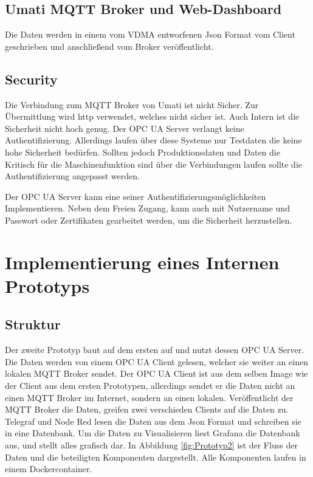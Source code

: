 \documentclass[a4paper, 12pt, oneside, toc=listofnumbered, bibliography=totoc]{scrbook}
\begin{document}
		
		
		\subsection{Umati MQTT Broker und Web-Dashboard}
	
		Die Daten werden in einem vom VDMA entworfenen Json Format vom Client geschrieben und anschließend vom Broker veröffentlicht. 
		
	
		\subsection{Security}
		
		Die Verbindung zum MQTT Broker von Umati ist nicht Sicher. Zur Übermittlung wird http verwendet, welches nicht sicher ist. Auch Intern ist die Sicherheit nicht hoch genug. Der OPC UA Server verlangt keine Authentifizierung. Allerdings laufen über diese Systeme nur Testdaten die keine hohe Sicherheit bedürfen. Sollten jedoch Produktionsdaten und Daten die Kritisch für die Maschinenfunktion sind über die Verbindungen laufen sollte die Authentifizierung angepasst werden. 
	
		Der OPC UA Server kann eine seiner Authentifizierungsmöglichkeiten Implementieren. Neben dem Freien Zugang, kann auch mit Nutzername und Passwort oder Zertifikaten gearbeitet werden, um die Sicherheit herzustellen. 
	
	\section{Implementierung eines Internen Prototyps}\label{ch:Implementierung-Intern}
	
		\subsection{Struktur}
		
		Der zweite Prototyp baut auf dem ersten auf und nutzt dessen OPC UA Server. Die Daten werden von einem OPC UA Client gelesen, welcher sie weiter an einen lokalen MQTT Broker sendet. Der OPC UA Client ist aus dem selben Image wie der Client aus dem ersten Prototypen, allerdings sendet er die Daten nicht an einen MQTT Broker im Internet, sondern an einen lokalen. Veröffentlicht der MQTT Broker die Daten, greifen zwei verschieden Clients auf die Daten zu. Telegraf und Node Red lesen die Daten aus dem Json Format und schreiben sie in eine Datenbank. Um die Daten zu Visualisieren liest Grafana die Datenbank aus, und stellt alles grafisch dar. In Abbildung \ref{fig:Prototyp2} ist der Fluss der Daten und die beteiligten Komponenten dargestellt. Alle Komponenten laufen in einem Dockercontainer.
		
\end{document}
